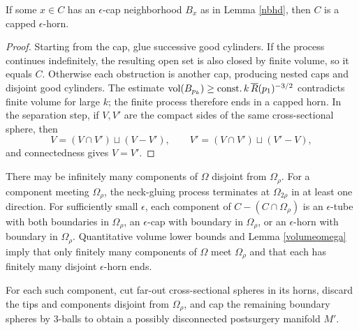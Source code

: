 \begin{lemma}
  \label{lem:kl-structure-at-first-singularity-time-existence-cap-geometry}

If some $x\in C$ has an $\epsilon$-cap neighborhood $B_x$ as in Lemma
\ref{nbhd}, then $C$ is a capped $\epsilon$-horn.
\end{lemma}
\begin{proof}
\sketch Starting from the cap, glue successive good cylinders. If the process
continues indefinitely, the resulting open set is also closed by finite volume,
so it equals $C$. Otherwise each obstruction is another cap, producing nested
caps and disjoint good cylinders. The estimate
$\operatorname{vol}(B_{p_k})\geq\operatorname{const.} k\,\overline R(p_1)^{-3/2}$ contradicts finite volume
for large $k$; the finite process therefore ends in a capped horn. In the
separation step, if $V,V'$ are the compact sides of the same cross-sectional
sphere, then
\begin{equation}
\label{eqndecompv}
V=(V\cap V')\sqcup(V-V'),\qquad V'=(V\cap V')\sqcup(V'-V),
\end{equation}
and connectedness gives $V=V'$.
\end{proof}

There may be infinitely many components of $\Omega$ disjoint from $\Omega_\rho$.
For a component meeting $\Omega_\rho$, the neck-gluing process terminates at
$\Omega_{2\rho}$ in at least one direction. For sufficiently small $\epsilon$,
each component of $C-(C\cap\Omega_\rho)$ is an $\epsilon$-tube with both
boundaries in $\Omega_\rho$, an $\epsilon$-cap with boundary in $\Omega_\rho$,
or an $\epsilon$-horn with boundary in $\Omega_\rho$. Quantitative volume
lower bounds and Lemma \ref{volumeomega} imply that only finitely many
components of $\Omega$ meet $\Omega_\rho$ and that each has finitely many
disjoint $\epsilon$-horn ends.

For each such component, cut far-out cross-sectional spheres in its horns,
discard the tips and components disjoint from $\Omega_\rho$, and cap the
remaining boundary spheres by $3$-balls to obtain a possibly disconnected
postsurgery manifold $M'$.

